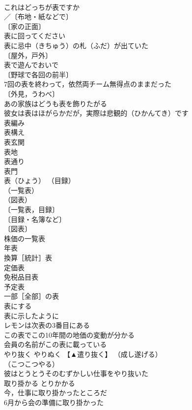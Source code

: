 \documentclass[8pt]{extreport}
\begin{document}
\begin{CJK}{UTF8}{min}
\\	これはどっちが表ですか 
\\	／〔布地・紙などで〕
\\	〔家の正面〕
\\	表に回ってください 
\\	表に忌中（きちゅう）の札（ふだ）が出ていた 
\\	〔屋外，戸外〕
\\	表で遊んでおいで 
\\	〔野球で各回の前半〕
\\	7回の表を終わって，依然両チーム無得点のままだった 
\\	〔外見，うわべ〕
\\	あの家族はどうも表を飾りたがる 
\\	彼女は表はほがらかだが，実際は悲観的（ひかんてき）です 
\\	表編み 
\\	表構え 
\\	表玄関 
\\	表地 
\\	表通り 
\\	表門 
\\	表（ひょう）		（目録）
\\	（一覧表）
\\	（図表）
\\	〔一覧表，目録〕
\\	〔目録・名簿など〕
\\	〔図表〕
\\	株価の一覧表 
\\	年表 
\\	換算［統計］表 
\\	定価表 
\\	免税品目表 
\\	予定表 
\\	一部［全部］の表 
\\	表にする 
\\	表に示したように 
\\	レモンは次表の3番目にある 
\\	この表でこの10年間の地価の変動が分かる 
\\	会員の名前がこの表に載っている 
\\	やり抜く	やりぬく	【▲遣り抜く】 （成し遂げる）
\\	（こつこつやる）
\\	彼はとうとうそのむずかしい仕事をやり抜いた 
\\	取り掛かる	とりかかる	
\\	今，仕事に取り掛かったところだ 
\\	6月から会の準備に取り掛かった 

\end{CJK}
\end{document}
